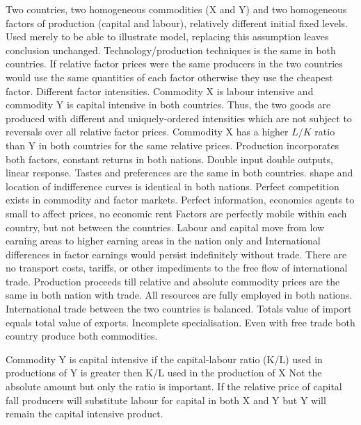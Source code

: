 \documentclass[12pt]{examnotes}
\begin{document}
Two countries, two homogeneous commodities (X and Y) and two homogeneous factors of production (capital and labour), relatively different initial fixed levels.
\quad\quad\ra Used merely to be able to illustrate model, replacing this assumption leaves conclusion unchanged.
 Technology/production techniques is the same in both countries.
\quad\quad\ra If relative factor prices were the same producers in the two countries would use the same quantities of each factor otherwise they use the cheapest factor.
 Different factor intensities. Commodity X is labour intensive and commodity Y is capital intensive in both countries. Thus, the two goods are produced with different and uniquely-ordered intensities which are not subject to reversals over all relative factor prices.
\quad\quad\ra Commodity X has a higher $L/K$ ratio than Y in both countries for the same relative prices.
 Production incorporates both factors, constant returns in both nations.
\quad\quad\ra Double input double outputs, linear response.
 Tastes and preferences are the same in both countries.
\quad\quad\ra shape and location of indifference curves is identical in both nations.
 Perfect competition exists in commodity and factor markets.
\quad\quad\ra Perfect information, economics agents to small to affect prices, no economic rent
 Factors are perfectly mobile within each country, but not between the countries.
\quad\quad\ra Labour and capital move from low earning areas to higher earning areas in the nation only and International differences in factor earnings would persist indefinitely without trade.
 There are no transport costs, tariffs, or other impediments to the free flow of international trade.
\quad\quad\ra Production proceeds till relative and absolute commodity prices are the same in both nation with trade.
 All resources are fully employed in both nations.
 International trade between the two countries is balanced.
\quad\quad\ra Totals value of import equals total value of exports.
 Incomplete specialisation.
\quad \ra Even with free trade both country produce both commodities.  

\ra Commodity Y is capital intensive if the capital-labour ratio (K/L) used in productions of Y is greater then K/L used in the production of X
\ra Not the absolute amount but only the ratio is important.
\ra If the relative price of capital fall producers will substitute labour for capital in both X and Y but Y will remain the capital intensive product.
\end{document}

